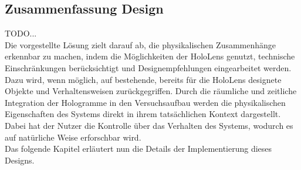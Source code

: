 \subsection{Zusammenfassung Design}
\label{sec-4-5}
TODO...\\
Die vorgestellte Lösung zielt darauf ab, die physikalischen Zusammenhänge erkennbar zu machen, indem die Möglichkeiten der HoloLens genutzt, technische Einschränkungen berücksichtigt und Designempfehlungen eingearbeitet werden. Dazu wird, wenn möglich, auf bestehende, bereits für die HoloLens designete Objekte und Verhaltensweisen zurückgegriffen. Durch die räumliche und zeitliche Integration der Hologramme in den Versuchsaufbau werden die physikalischen Eigenschaften des Systems direkt in ihrem tatsächlichen Kontext dargestellt. Dabei hat der Nutzer die Kontrolle über das Verhalten des Systems, wodurch es auf natürliche Weise erforschbar wird.\\

Das folgende Kapitel erläutert nun die Details der Implementierung dieses Designs.


